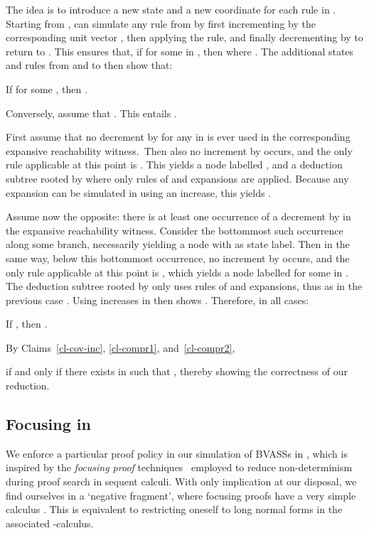 The idea is to introduce a new state  and a new coordinate
for each rule  in .  Starting from
,  can simulate any rule  from
 by first incrementing by the corresponding unit
vector , then applying the rule, and finally decrementing by
 to return to .  This ensures that, if
 for some  in
, then  where
.  The additional states and rules
from  and to  then show that:
\begin{claim}\label{cl-compr1}
  If  for some , then .
\end{claim}

Conversely, assume that .  This entails .

First assume that no decrement by  for any  in
 is ever used in the corresponding expansive
reachability witness.\ifshort\pagebreak\fi\ Then also no increment by
 occurs, and the only rule applicable at this point is
.  This yields a node 
labelled , and a deduction subtree rooted by  where
only rules of  and expansions are applied.  Because any
expansion can be simulated in  using an increase, this
yields .

Assume now the opposite: there is at least one occurrence of a
decrement by  in the expansive reachability witness.
Consider the bottommost such occurrence along some branch, necessarily
yielding a node with  as state label.  Then in the same
way, below this bottommost occurrence, no increment by 
occurs, and the only rule applicable at this point is
, which yields a node 
labelled  for some  in .  The deduction
subtree rooted by  only uses rules of  and expansions,
thus as in the previous case .
Using increases in  then shows .  Therefore, in all cases:
\begin{claim}\label{cl-compr2}
  If , then .
\end{claim}
By Claims~\ref{cl-cov-inc}, \ref{cl-compr1}, and~\ref{cl-compr2},

if and only if there exists  in  such that
, thereby showing the correctness of our
reduction.

\subsection{Focusing  in }\label{sub-focus}
We enforce a particular proof policy in our simulation of BVASSs in
, which is inspired by the \emph{focusing proof}
techniques~\citep{andreoli92} employed to reduce non-determinism
during proof search in sequent calculi.  With only implication at our
disposal, we find ourselves in a `negative fragment', where focusing
proofs have a very simple calculus .  This is equivalent to
restricting oneself to long normal forms in the associated
-calculus.

